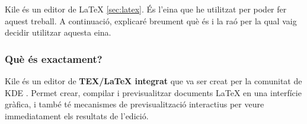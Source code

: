 %
%
Kile \cite{kile} és un editor de LaTeX \ref{sec:latex}. És l’eina que he utilitzat per poder fer aquest treball. A continuació, explicaré breument què és i la raó per la qual vaig decidir utilitzar aquesta eina.


\subsubsection{Què és exactament?}
Kile és un editor de \textbf{TEX/LaTeX integrat} que va ser creat per la comunitat de KDE \cite{kile}. Permet crear, compilar i previsualitzar documents LaTeX en una interfície gràfica, i també té mecanismes de previsualització interactius per veure immediatament els resultats de l’edició.


